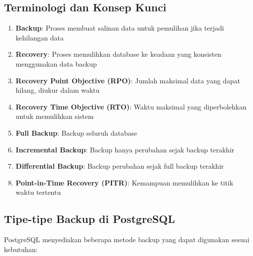 \subsection{Terminologi dan Konsep Kunci}
\begin{enumerate}
    \item \textbf{Backup}: Proses membuat salinan data untuk pemulihan jika terjadi kehilangan data
    \item \textbf{Recovery}: Proses memulihkan database ke keadaan yang konsisten menggunakan data backup
    \item \textbf{Recovery Point Objective (RPO)}: Jumlah maksimal data yang dapat hilang, diukur dalam waktu
    \item \textbf{Recovery Time Objective (RTO)}: Waktu maksimal yang diperbolehkan untuk memulihkan sistem
    \item \textbf{Full Backup}: Backup seluruh database
    \item \textbf{Incremental Backup}: Backup hanya perubahan sejak backup terakhir
    \item \textbf{Differential Backup}: Backup perubahan sejak full backup terakhir
    \item \textbf{Point-in-Time Recovery (PITR)}: Kemampuan memulihkan ke titik waktu tertentu
\end{enumerate}

\subsection{Tipe-tipe Backup di PostgreSQL}
PostgreSQL menyediakan beberapa metode backup yang dapat digunakan sesuai kebutuhan:

